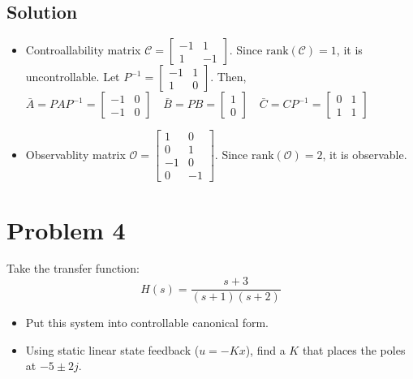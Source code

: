 \documentclass[11pt]{report}
\begin{document}

\subsection*{Solution}
\begin{itemize}
\item Controallability matrix $\mathcal{C} = \begin{bmatrix} -1 & 1 \\1 & -1 \end{bmatrix}$. Since $\text{rank}(\mathcal{C}) = 1$, it is uncontrollable. Let $P^{-1} = \begin{bmatrix} -1 & 1 \\1 & 0 \end{bmatrix}$. Then, $\bar{A} = P A P^{-1} = \begin{bmatrix} -1 & 0 \\ -1 & 0 \end{bmatrix} \quad \bar{B} = PB = \begin{bmatrix} 1 \\ 0 \end{bmatrix} \quad \bar{C} = CP^{-1} = \begin{bmatrix} 0 & 1 \\ 1 & 1 \end{bmatrix}$
\item Observablity matrix $\mathcal{O} = \begin{bmatrix} 1 & 0 \\0 & 1\\-1 & 0\\0 & -1 \end{bmatrix}$. Since $\text{rank}(\mathcal{O}) = 2$, it is observable.
\end{itemize}

\pagebreak
\section*{Problem 4}

Take the transfer function:
\[
H(s) = \frac{s+3}{(s+1)(s+2)}
\]
\begin{itemize}
\item Put this system into controllable canonical form.
\item Using static linear state feedback ($u = -Kx$), find a $K$ that places the poles at $-5 \pm 2j$.
\end{itemize}
\end{document}

